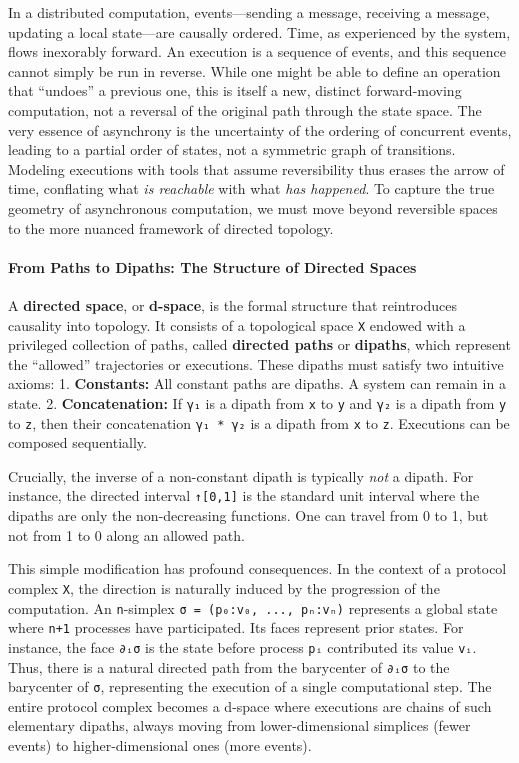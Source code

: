 \documentclass[
]{article}
\begin{document}
In a distributed computation, events---sending a message, receiving a
message, updating a local state---are causally ordered. Time, as
experienced by the system, flows inexorably forward. An execution is a
sequence of events, and this sequence cannot simply be run in reverse.
While one might be able to define an operation that ``undoes'' a
previous one, this is itself a new, distinct forward-moving computation,
not a reversal of the original path through the state space. The very
essence of asynchrony is the uncertainty of the ordering of concurrent
events, leading to a partial order of states, not a symmetric graph of
transitions. Modeling executions with tools that assume reversibility
thus erases the arrow of time, conflating what \emph{is reachable} with
what \emph{has happened}. To capture the true geometry of asynchronous
computation, we must move beyond reversible spaces to the more nuanced
framework of directed topology.

\paragraph{From Paths to Dipaths: The Structure of Directed
Spaces}\label{from-paths-to-dipaths-the-structure-of-directed-spaces}

A \textbf{directed space}, or \textbf{d-space}, is the formal structure
that reintroduces causality into topology. It consists of a topological
space \texttt{X} endowed with a privileged collection of paths, called
\textbf{directed paths} or \textbf{dipaths}, which represent the
``allowed'' trajectories or executions. These dipaths must satisfy two
intuitive axioms: 1. \textbf{Constants:} All constant paths are dipaths.
A system can remain in a state. 2. \textbf{Concatenation:} If
\texttt{γ₁} is a dipath from \texttt{x} to \texttt{y} and \texttt{γ₂} is
a dipath from \texttt{y} to \texttt{z}, then their concatenation
\texttt{γ₁\ *\ γ₂} is a dipath from \texttt{x} to \texttt{z}. Executions
can be composed sequentially.

Crucially, the inverse of a non-constant dipath is typically \emph{not}
a dipath. For instance, the directed interval \texttt{↑{[}0,1{]}} is the
standard unit interval where the dipaths are only the non-decreasing
functions. One can travel from 0 to 1, but not from 1 to 0 along an
allowed path.

This simple modification has profound consequences. In the context of a
protocol complex \texttt{X}, the direction is naturally induced by the
progression of the computation. An \texttt{n}-simplex
\texttt{σ\ =\ (p₀:v₀,\ ...,\ pₙ:vₙ)} represents a global state where
\texttt{n+1} processes have participated. Its faces represent prior
states. For instance, the face \texttt{∂ᵢσ} is the state before process
\texttt{pᵢ} contributed its value \texttt{vᵢ}. Thus, there is a natural
directed path from the barycenter of \texttt{∂ᵢσ} to the barycenter of
\texttt{σ}, representing the execution of a single computational step.
The entire protocol complex becomes a d-space where executions are
chains of such elementary dipaths, always moving from lower-dimensional
simplices (fewer events) to higher-dimensional ones (more events).
\end{document}
